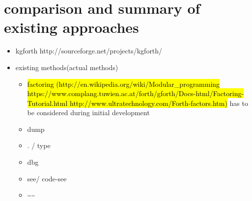 \section{comparison and summary of existing approaches}

\begin{itemize}
\item kgforth http://sourceforge.net/projects/kgforth/
\item existing methods(actual methods)
	\begin{itemize}
	\item \hl{factoring (http://en.wikipedia.org/wiki/Modular\_programming https://www.complang.tuwien.ac.at/forth/gforth/Docs-html/Factoring-Tutorial.html http://www.ultratechnology.com/Forth-factors.htm)} has to be considered during initial development
	\item dump
	\item . / type
	\item dbg
	\item see/ code-see
	\item \textasciitilde\textasciitilde
	\end{itemize}
\end{itemize}